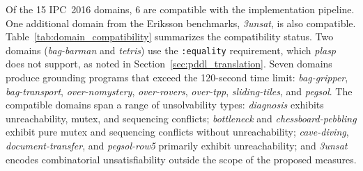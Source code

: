 Of the 15 \ac{IPC}~2016 domains, 6 are compatible with the implementation pipeline. One additional domain from the Eriksson benchmarks, \textit{3unsat}, is also compatible. Table~\ref{tab:domain_compatibility} summarizes the compatibility status. Two domains (\textit{bag-barman} and \textit{tetris}) use the \texttt{:equality} requirement, which \textit{plasp} does not support, as noted in Section~\ref{sec:pddl_translation}. Seven domains produce grounding programs that exceed the 120-second time limit: \textit{bag-gripper}, \textit{bag-transport}, \textit{over-nomystery}, \textit{over-rovers}, \textit{over-tpp}, \textit{sliding-tiles}, and \textit{pegsol}. The compatible domains span a range of unsolvability types: \textit{diagnosis} exhibits unreachability, mutex, and sequencing conflicts; \textit{bottleneck} and \textit{chessboard-pebbling} exhibit pure mutex and sequencing conflicts without unreachability; \textit{cave-diving}, \textit{document-transfer}, and \textit{pegsol-row5} primarily exhibit unreachability; and \textit{3unsat} encodes combinatorial unsatisfiability outside the scope of the proposed measures.

